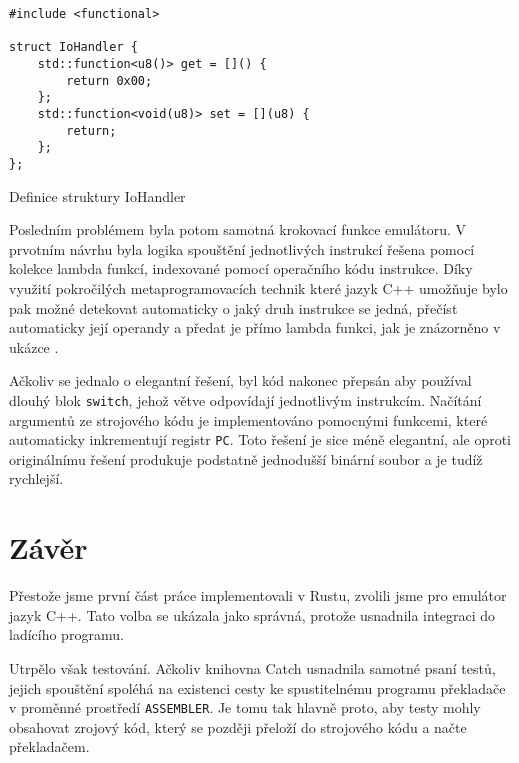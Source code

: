 \begin{listing}
\begin{verbatim}
#include <functional>

struct IoHandler {
    std::function<u8()> get = []() {
        return 0x00;
    };
    std::function<void(u8)> set = [](u8) {
        return;
    };
};
\end{verbatim}
\caption{Definice struktury IoHandler}
\label{fig:io-handler}
\end{listing}

Posledním problémem byla potom samotná krokovací funkce emulátoru. V prvotním návrhu byla logika spouštění jednotlivých instrukcí řešena pomocí kolekce lambda funkcí, indexované pomocí operačního kódu instrukce. Díky využití pokročilých metaprogramovacích technik které jazyk C++ umožňuje bylo pak možné detekovat automaticky o jaký druh instrukce se jedná, přečíst automaticky její operandy a předat je přímo lambda funkci, jak je znázorněno v ukázce .

Ačkoliv se jednalo o elegantní řešení, byl kód nakonec přepsán aby používal dlouhý blok \texttt{switch}, jehož větve odpovídají jednotlivým instrukcím. Načítání argumentů ze strojového kódu je implementováno pomocnými funkcemi, které automaticky inkrementují registr \texttt{PC}. Toto řešení je sice méně elegantní, ale oproti originálnímu řešení produkuje podstatně jednodušší binární soubor a je tudíž rychlejší.

\section{Závěr}

Přestože jsme první část práce implementovali v Rustu, zvolili jsme pro emulátor jazyk C++. Tato volba se ukázala jako správná, protože usnadnila integraci do ladícího programu.

Utrpělo však testování. Ačkoliv knihovna Catch usnadnila samotné psaní testů, jejich spouštění spoléhá na existenci cesty ke spustitelnému programu překladače v proměnné prostředí \texttt{ASSEMBLER}. Je tomu tak hlavně proto, aby testy mohly obsahovat zrojový kód, který se později přeloží do strojového kódu a načte překladačem.